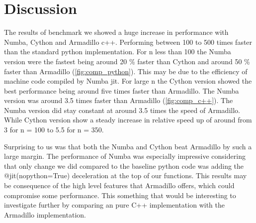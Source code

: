 \section*{Discussion}

The results of benchmark we showed a huge increase in performance with Numba,
Cython and Armadillo c++. Performing between 100 to 500 times faster than the standard python implementation.
For n less than 100 the Numba version were the fastest being around 20
\% faster than Cython and around 50 \% faster than Armadillo (\cref{fig:comp_python}). This may be due to the
efficiency of machine code compiled by Numba jit. For large n the Cython version
showed the best performance being around five times faster than Armadillo. The
Numba version was around 3.5 times faster than Armadillo (\cref{fig:comp_c++}).
The Numba version did stay constant at around 3.5 times the speed of Armadillo.
While Cython version show a steady increase in relative speed up of around from
3 for n = 100 to 5.5 for n = 350. 

Surprising to us was that both the Numba and Cython beat Armadillo by such
a large margin. The performance of Numba was especially impressive considering
that only change we did compared to the baseline python code was adding the
@jit(nopython=True) deceleration at the top of our functions. This results may
be consequence of the high level features that Armadillo offers, which could
compromise some performance. This something that would be interesting to
investigate further by comparing an pure C++ implementation with the Armadillo
implementation. 



